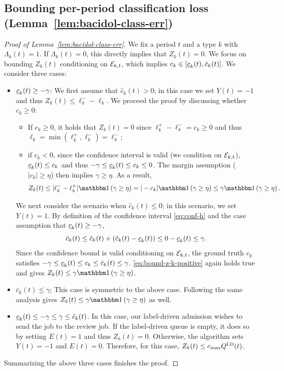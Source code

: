 \subsection{Bounding per-period classification loss (Lemma~\ref{lem:bacidol-class-err})}\label{app:lem-bacidol-class-err}
\begin{proof}[Proof of Lemma~\ref{lem:bacidol-class-err}]
We fix a period $t$ and a type $k$ with $\Lambda_k(t) = 1$. If $\Lambda_k(t) = 0$, this directly implies that $Z_k(t) = 0$. We focus on bounding $Z_k(t)$ conditioning on $\mathcal{E}_{k,t}$, which implies $c_k \in [\underline{c}_k(t), \bar{c}_k(t)]$. We consider three cases:
\begin{itemize}
\item $\underline{c}_k(t) \geq -\gamma$: We first assume that $\hat{c}_k(t) > 0$; in this case we set $Y(t) = -1$ and thus $Z_k(t) \leq \ell_k^- - \ell_k$. We proceed the proof by discussing whether $c_k \geq 0$:
\begin{itemize}
\item If $c_k \geq 0$, it holds that $Z_k(t) = 0$ since $\ell_k^+ - \ell_k^- = c_k \geq 0$ and thus $\ell_k = \min(\ell_k^+, \ell_k^-) = \ell_k^-$;
\item if $c_k < 0$, since the confidence interval is valid (we condition on $\mathcal{E}_{k,t}$), $\underline{c}_k(t) \leq c_k$ and thus $-\gamma \leq \underline{c}_k(t) \leq c_k \leq 0$. The margin assumption ($|c_k| \geq \eta$) then implies $\gamma \geq \eta$. As a result,
\begin{equation}\label{eq:bound-z-k-positive}
Z_k(t) \leq |\ell_k^- - \ell_k^+|\indic{\gamma \geq \eta} = |-c_k|\indic{\gamma \geq \eta} \leq \gamma \indic{\gamma \geq \eta}.
\end{equation} 
\end{itemize}
We next consider the scenario when $\hat{c}_k(t) \leq 0$; in this scenario, we set $Y(t) = 1$. By definition of the confidence interval \eqref{eq:conf-h} and the case assumption that $\underline{c}_k(t) \geq -\gamma$,
\[\bar{c}_k(t) \leq \hat{c}_k(t) + (\hat{c}_k(t) - \underline{c}_k(t))  \leq 0 - \underline{c}_k(t) \leq \gamma.\] 
 Since the confidence bound is valid conditioning on $\mathcal{E}_{k,t}$, the ground truth $c_k$ satisfies $-\gamma \leq \underline{c}_k(t) \leq c_k \leq \bar{c}_k(t) \leq \gamma$. \eqref{eq:bound-z-k-positive} again holds true and gives $Z_k(t) \leq \gamma\indic{\gamma \geq \eta}$. 
\item $\bar{c}_k(t) \leq \gamma$; This case is symmetric to the above case. Following the same analysis gives $Z_k(t) \leq \gamma \indic{\gamma \geq \eta}$ as well.
\item $\underline{c}_k(t) \leq -\gamma \leq \gamma \leq \bar{c}_k(t)$. In this case, our label-driven admission wishes to send the job to the review job. If the label-driven queue is empty, it does so by setting $E(t) = 1$ and thus $Z_k(t) = 0$. Otherwise, the algorithm sets $Y(t) = -1$ and $E(t) = 0$. Therefore, for this case, $Z_k(t) \leq c_{\max} Q^{\mathcal{\textsc{LD}}}(t)$.
\end{itemize}
Summarizing the above three cases finishes the proof.
\end{proof}


